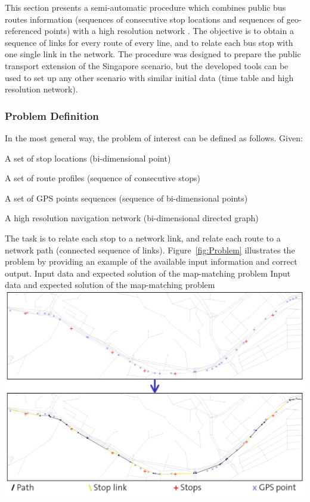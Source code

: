 This section presents a semi-automatic procedure which combines public bus routes information (sequences of consecutive stop locations and sequences of geo-referenced points) with a high resolution network \citep[][]{Ordonez_HKSTS_2011}. The objective is to obtain a sequence of links for every route of every line, and to relate each bus stop with one single link in the network. The procedure was designed to prepare the public transport extension of the Singapore scenario, but the developed tools can be used to set up any other scenario with similar initial data (time table and high resolution network).

\subsubsection{Problem Definition}
In the most general way, the problem of interest can be defined as follows. Given:
%
\begin{compactitem}
\item A set of stop locations (bi-dimensional point)
\item A set of route profiles (sequence of consecutive stops)
\item A set of GPS points sequences (sequence of bi-dimensional points)
\item A high resolution navigation network (bi-dimensional directed graph)
\end{compactitem}
%
The task is to relate each stop to a network link, and relate each route to a network path (connected sequence of links). Figure~\ref{fig:Problem} illustrates the problem by providing an example of the available input information and correct output.
%
\createfigure
{Input data and expected solution of the map-matching problem}
{Input data and expected solution of the map-matching problem}
{\label{fig:Problem}}
{\includegraphics[width=1.0\textwidth]{extending/figures/semiAuto/Problem.png}}
{}

